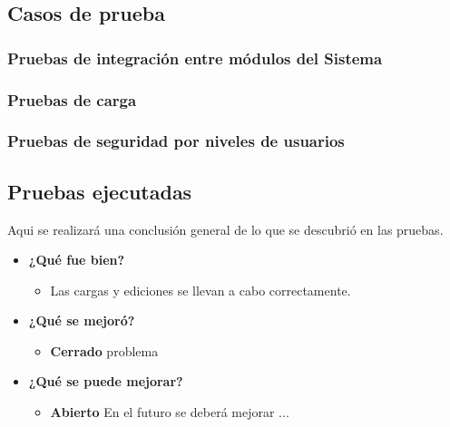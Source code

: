 \subsection{Casos de prueba}

\subsubsection{Pruebas de integración  entre módulos del Sistema}

\subsubsection{Pruebas de carga}

\subsubsection{Pruebas de seguridad por niveles de usuarios}


\subsection{Pruebas ejecutadas}
Aqui se realizará una conclusión general de lo que se descubrió en las pruebas.
	\begin{itemize}
		\item \textbf{¿Qué fue bien?}
        	\begin{itemize}
				\item        Las cargas y ediciones se llevan a cabo correctamente.
			\end{itemize}

   		\item \textbf{¿Qué se mejoró?}
        	\begin{itemize}
                \item \textbf{Cerrado} problema
			\end{itemize}

   		\item \textbf{¿Qué se puede mejorar?}
        	\begin{itemize}
		        \item \textbf{Abierto} En el futuro se deberá mejorar ...
            \end{itemize}
        

	\end{itemize}
